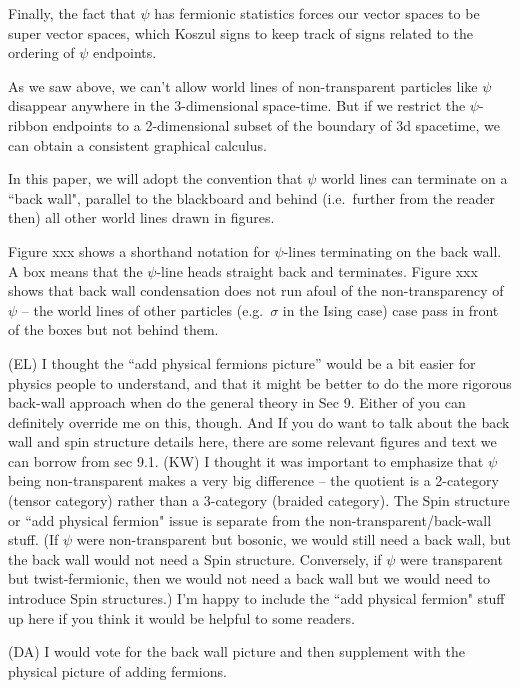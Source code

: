 \documentclass[12pt,a4paper]{article}
\newcommand{\dave}[1]{{\color{ao(english)}\footnotesize{(DA) #1}}}
\newcommand{\ethan}[1]{{\color{amethyst}\footnotesize{(EL) #1}}}
\newcommand{\kw}[1]{{\color{kwcolor}\footnotesize{(KW) #1}}}
\begin{document}
Finally, the fact that $\psi$ has fermionic statistics forces our vector spaces to be super vector spaces,
which Koszul signs to keep track of signs related to the ordering of $\psi$ endpoints.

\medskip

As we saw above, we can't allow world lines of non-transparent particles like $\psi$ disappear anywhere
in the 3-dimensional space-time.
But if we restrict the $\psi$-ribbon endpoints to a 2-dimensional subset of the boundary of 3d spacetime,
we can obtain a consistent graphical calculus.

In this paper, we will adopt the convention that $\psi$ world lines can terminate on a ``back wall", parallel to the 
blackboard and behind (i.e.\ further from the reader then) all other world lines drawn in figures.

Figure xxx shows a shorthand notation for $\psi$-lines terminating on the back wall.
A box means that the $\psi$-line heads straight back and terminates.
Figure xxx shows that back wall condensation does not run afoul of the non-transparency of $\psi$ --
the world lines of other particles (e.g.\ $\sigma$ in the Ising case) case pass in front of the boxes
but not behind them.

\ethan{I thought the ``add physical fermions picture'' would be a bit easier for physics people to understand, and that it might be better to do the more rigorous back-wall approach when do the general theory in Sec 9. 
Either of you can definitely override me on this, though. 
And If you do want to talk about the back wall and spin structure details here, there are some relevant figures and text we can borrow from sec 9.1.}
\kw{I thought it was important to emphasize that $\psi$ being non-transparent makes a very big difference -- the quotient is a 2-category (tensor category) rather than a 3-category (braided category).
The Spin structure or ``add physical fermion" issue is separate from the non-transparent/back-wall stuff.
(If $\psi$ were non-transparent but bosonic, we would still need a back wall, but the back wall would not need a Spin structure.
Conversely, if $\psi$ were transparent but twist-fermionic, then we would not need a back wall but we would need to introduce Spin
structures.)
I'm happy to include the ``add physical fermion" stuff up here if you think it would be helpful to some readers.}

\dave{I would vote for the back wall picture and then supplement with the physical picture of adding fermions. }
\end{document}
